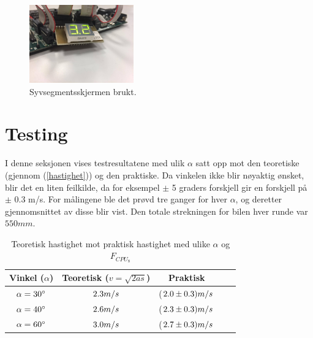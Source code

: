 \documentclass[11pt, a4paper]{report}
\begin{document}
\begin{figure}[htbp]
	\begin{center}
		\includegraphics[width=0.4\textwidth, right]{display.jpg}
		\caption{Syvsegmentsskjermen brukt.}
	\end{center}
\end{figure}

\section{Testing}
I denne seksjonen vises testresultatene med ulik $\alpha$ satt opp mot den teoretiske (gjennom (\ref{hastighet})) og den praktiske. Da vinkelen ikke blir nøyaktig ønsket, blir det en liten feilkilde, da for eksempel $\pm$ 5 graders forskjell gir en forskjell på $\pm$ 0.3 m/s. For målingene ble det prøvd tre ganger for hver $\alpha$, og deretter gjennomsnittet av disse blir vist. Den totale strekningen for bilen hver runde var $550mm$.

\begin{table}[h]
\caption{Teoretisk hastighet mot praktisk hastighet med ulike $\alpha$ og $F_{CPU_{8}}$}
\begin{center}
\begin{tabular}{ccccc}
\hline
Vinkel ($\alpha$)  & Teoretisk ($ v =\sqrt{2as}$) &  Praktisk\\
\hline

$\alpha = 30^{\circ}\rm$ & $2.3 m/s\rm$ & ($2.0 \pm 0.3) m/s \rm$\\

$\alpha = 40^{\circ}\rm$ & $2.6 m/s\rm $& ($2.3 \pm 0.3) m/s \rm $ \\

$\alpha = 60^{\circ}\rm$ & $3.0 m/s\rm $& ($2.7\pm 0.3) m/s \rm $ \\

\hline

\end{tabular}
\end{center}
\end{table}
\end{document}
